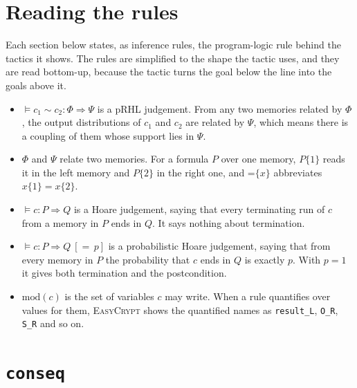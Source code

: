\documentclass[10pt,a4paper]{article}
\newcommand{\eqj}[4]{\models #1 \sim #2 : #3 \Rightarrow #4}
\newcommand{\hj}[3]{\models #1 : #2 \Rightarrow #3}
\newcommand{\phj}[4]{\models #1 : #2 \Rightarrow #3\ [{=}\,#4]}
\newcommand{\Eq}[1]{\mathord{=}\{#1\}}
\newcommand{\mods}{\mathrm{mod}}
\newcommand{\ec}{\lstinline[basicstyle=\small\ttfamily]}
\newcommand{\EC}{\textsc{EasyCrypt}}
\begin{document}
\section{Reading the rules}\label{sec:reading}

Each section below states, as inference rules, the program-logic rule behind the tactics it shows.
The rules are simplified to the shape the tactic uses, and they are read bottom-up, because the tactic turns the goal below the line into the goals above it.

\begin{itemize}
  \item $\eqj{c_1}{c_2}{\Phi}{\Psi}$ is a pRHL judgement.
    From any two memories related by $\Phi$, the output distributions of $c_1$ and $c_2$ are related by $\Psi$, which means there is a coupling of them whose support lies in $\Psi$.
  \item $\Phi$ and $\Psi$ relate two memories.
    For a formula $P$ over one memory, $P\{1\}$ reads it in the left memory and $P\{2\}$ in the right one, and $\Eq{x}$ abbreviates $x\{1\} = x\{2\}$.
  \item $\hj{c}{P}{Q}$ is a Hoare judgement, saying that every terminating run of $c$ from a memory in $P$ ends in $Q$.
    It says nothing about termination.
  \item $\phj{c}{P}{Q}{p}$ is a probabilistic Hoare judgement, saying that from every memory in $P$ the probability that $c$ ends in $Q$ is exactly $p$.
    With $p = 1$ it gives both termination and the postcondition.
  \item $\mods(c)$ is the set of variables $c$ may write.
    When a rule quantifies over values for them, \EC{} shows the quantified names as \ec|result_L|, \ec|O_R|, \ec|S_R| and so on.
\end{itemize}


\section{\texorpdfstring{\texttt{conseq}}{conseq}}\label{sec:conseq}
\end{document}
